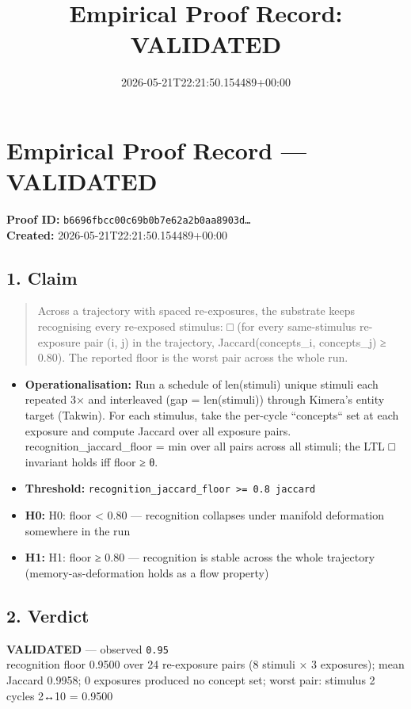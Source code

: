 \documentclass{article}
\title{Empirical Proof Record: VALIDATED}
\date{2026-05-21T22:21:50.154489+00:00}
\begin{document}
\maketitle
\section*{Empirical Proof Record --- \textcolor{validated}{\textbf{VALIDATED}}}
\textbf{Proof ID:} \texttt{b6696fbcc00c69b0b7e62a2b0aa8903d\dots}\\
\textbf{Created:} 2026-05-21T22:21:50.154489+00:00
\subsection*{1. Claim}
\begin{quote}Across a trajectory with spaced re-exposures, the substrate keeps recognising every re-exposed stimulus: □ (for every same-stimulus re-exposure pair (i, j) in the trajectory, Jaccard(concepts\_i, concepts\_j) ≥ 0.80). The reported floor is the worst pair across the whole run.\end{quote}
\begin{itemize}
\item \textbf{Operationalisation:} Run a schedule of len(stimuli) unique stimuli each repeated 3× and interleaved (gap = len(stimuli)) through Kimera's entity target (Takwin). For each stimulus, take the per-cycle ``concepts`` set at each exposure and compute Jaccard over all exposure pairs. recognition\_jaccard\_floor = min over all pairs across all stimuli; the LTL □ invariant holds iff floor ≥ θ.
\item \textbf{Threshold:} \texttt{recognition\_jaccard\_floor >= 0.8 jaccard}
\item \textbf{H0:} H0: floor < 0.80 — recognition collapses under manifold deformation somewhere in the run
\item \textbf{H1:} H1: floor ≥ 0.80 — recognition is stable across the whole trajectory (memory-as-deformation holds as a flow property)
\end{itemize}
\subsection*{2. Verdict}
\textcolor{validated}{\textbf{VALIDATED}} --- observed \texttt{0.95}\\
recognition floor 0.9500 over 24 re-exposure pairs (8 stimuli × 3 exposures); mean Jaccard 0.9958; 0 exposures produced no concept set; worst pair: stimulus 2 cycles 2↔10 = 0.9500
\end{document}

